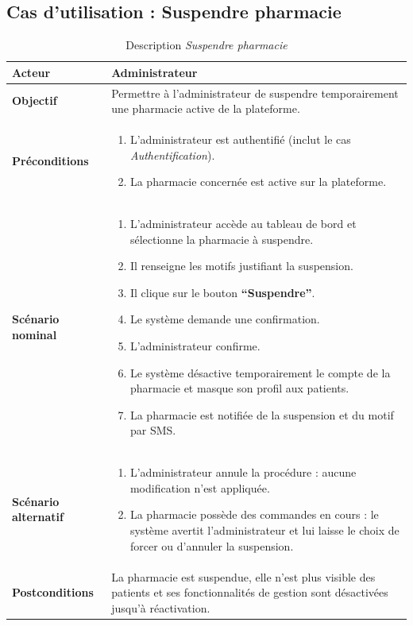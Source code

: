 \documentclass[12pt,a4paper]{report}
\begin{document}
\subsection*{Cas d'utilisation : Suspendre pharmacie}

\begin{table}[H]
    \centering
    \begin{tabular}{|p{4cm}|p{9cm}|}
        \hline
        \textbf{Acteur} & Administrateur \\
        \hline
        \textbf{Objectif} & Permettre à l'administrateur de suspendre temporairement une pharmacie active de la plateforme. \\
        \hline
        \textbf{Préconditions} &
        \begin{enumerate}
            \item L'administrateur est authentifié (inclut le cas \textit{Authentification}).
            \item La pharmacie concernée est active sur la plateforme.
        \end{enumerate} \\
        \hline
        \textbf{Scénario nominal} &
        \begin{enumerate}
            \item L'administrateur accède au tableau de bord et sélectionne la pharmacie à suspendre.
            \item Il renseigne les motifs justifiant la suspension.
            \item Il clique sur le bouton \textbf{``Suspendre''}.
            \item Le système demande une confirmation.
            \item L'administrateur confirme.
            \item Le système désactive temporairement le compte de la pharmacie et masque son profil aux patients.
            \item La pharmacie est notifiée de la suspension et du motif par SMS.
        \end{enumerate} \\
        \hline
        \textbf{Scénario alternatif} &
        \begin{enumerate}
            \item[4.a] L'administrateur annule la procédure : aucune modification n'est appliquée.
            \item[6.a] La pharmacie possède des commandes en cours : le système avertit l'administrateur et lui laisse le choix de forcer ou d'annuler la suspension.
        \end{enumerate} \\
        \hline
        \textbf{Postconditions} & La pharmacie est suspendue, elle n'est plus visible des patients et ses fonctionnalités de gestion sont désactivées jusqu'à réactivation. \\
        \hline
    \end{tabular}
    \caption{Description \textit{Suspendre pharmacie}}
\end{table}
\end{document}
